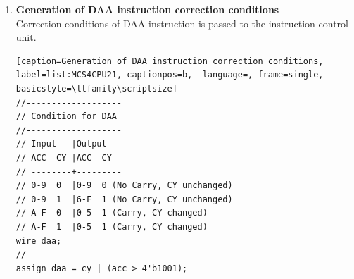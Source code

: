 \begin{enumerate}[(1)]
\item \textbf{Generation of DAA instruction correction conditions}\\
Correction conditions of DAA instruction is passed to the instruction control unit.
\\
\begin{lstlisting}[caption=Generation of DAA instruction correction conditions, 
label=list:MCS4CPU21, captionpos=b,  language=, frame=single, basicstyle=\ttfamily\scriptsize]
//-------------------
// Condition for DAA
//-------------------
// Input   |Output
// ACC  CY |ACC  CY
// --------+---------
// 0-9  0  |0-9  0 (No Carry, CY unchanged)
// 0-9  1  |6-F  1 (No Carry, CY unchanged)
// A-F  0  |0-5  1 (Carry, CY changed)
// A-F  1  |0-5  1 (Carry, CY changed)
wire daa;
//
assign daa = cy | (acc > 4'b1001);
\end{lstlisting}


\end{enumerate}
